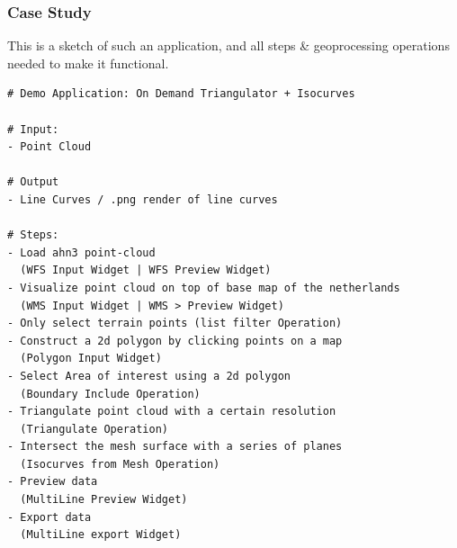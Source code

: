 

\subsubsection*{Case Study}

This is a sketch of such an application, and all steps \& geoprocessing operations needed to make it functional.

\begin{lstlisting}
# Demo Application: On Demand Triangulator + Isocurves

# Input: 
- Point Cloud

# Output
- Line Curves / .png render of line curves

# Steps: 
- Load ahn3 point-cloud 
  (WFS Input Widget | WFS Preview Widget)
- Visualize point cloud on top of base map of the netherlands 
  (WMS Input Widget | WMS > Preview Widget)
- Only select terrain points (list filter Operation)
- Construct a 2d polygon by clicking points on a map 
  (Polygon Input Widget)
- Select Area of interest using a 2d polygon 
  (Boundary Include Operation)
- Triangulate point cloud with a certain resolution 
  (Triangulate Operation)
- Intersect the mesh surface with a series of planes 
  (Isocurves from Mesh Operation)
- Preview data 
  (MultiLine Preview Widget)
- Export data 
  (MultiLine export Widget)
\end{lstlisting}
